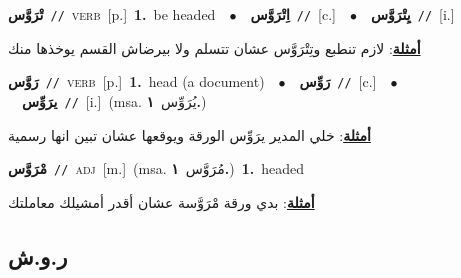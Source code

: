 \documentclass[10pt,a4paper,twoside]{article} %
\begin{document}
\begin{multicols}{2}
{\setlength\topsep{0pt}\textbf{\foreignlanguage{arabic}{تْرَوَّس}}\ {\color{gray}\texttt{//}\color{black}}\ \textsc{verb}\ [p.]\ \textbf{1.}~be headed\ \ $\bullet$\ \ \setlength\topsep{0pt}\textbf{\foreignlanguage{arabic}{اِتْرَوَّس}}\ {\color{gray}\texttt{//}\color{black}}\ [c.]\ \ $\bullet$\ \ \setlength\topsep{0pt}\textbf{\foreignlanguage{arabic}{يِتْرَوَّس}}\ {\color{gray}\texttt{//}\color{black}}\ [i.]\  \begin{flushright}\color{gray}\foreignlanguage{arabic}{\textbf{\underline{\foreignlanguage{arabic}{أمثلة}}}: لازم تنطبع وتِتْرَوَّس عشان تتسلم ولا بيرضاش القسم يوخذها منك}\end{flushright}\color{black}} \vspace{2mm}

{\setlength\topsep{0pt}\textbf{\foreignlanguage{arabic}{رَوَّس}}\ {\color{gray}\texttt{//}\color{black}}\ \textsc{verb}\ [p.]\ \textbf{1.}~head (a document)\ \ $\bullet$\ \ \setlength\topsep{0pt}\textbf{\foreignlanguage{arabic}{رَوِّس}}\ {\color{gray}\texttt{//}\color{black}}\ [c.]\ \ $\bullet$\ \ \setlength\topsep{0pt}\textbf{\foreignlanguage{arabic}{يرَوِّس}}\ {\color{gray}\texttt{//}\color{black}}\ [i.]\ \color{gray}(msa. \foreignlanguage{arabic}{يُرَوِّس}~\foreignlanguage{arabic}{\textbf{١.}})\color{black}\  \begin{flushright}\color{gray}\foreignlanguage{arabic}{\textbf{\underline{\foreignlanguage{arabic}{أمثلة}}}: خلي المدير يرَوِّس الورقة ويوقعها عشان تبين انها رسمية}\end{flushright}\color{black}} \vspace{2mm}

{\setlength\topsep{0pt}\textbf{\foreignlanguage{arabic}{مْرَوَّس}}\ {\color{gray}\texttt{//}\color{black}}\ \textsc{adj}\ [m.]\ \color{gray}(msa. \foreignlanguage{arabic}{مُرَوَّس}~\foreignlanguage{arabic}{\textbf{١.}})\color{black}\ \textbf{1.}~headed\  \begin{flushright}\color{gray}\foreignlanguage{arabic}{\textbf{\underline{\foreignlanguage{arabic}{أمثلة}}}: بدي ورقة مْرَوَّسة عشان أقدر أمشيلك معاملتك}\end{flushright}\color{black}} \vspace{2mm}

\vspace{-3mm}
\subsection*{\color{blue}\foreignlanguage{arabic}{ر.و.ش}\color{blue}{}} 


\end{multicols}
\end{document}
